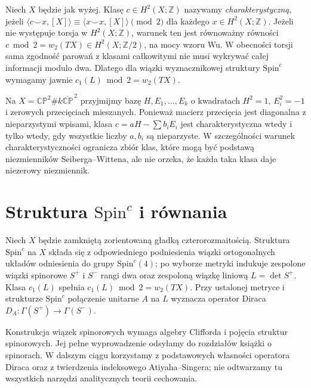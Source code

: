 \begin{definicja}
Niech $X$ będzie jak wyżej. Klasę $c\in H^2(X;\mathbb Z)$
nazywamy \emph{charakterystyczną}, jeżeli
$\langle c\smile x,[X]\rangle\equiv
\langle x\smile x,[X]\rangle\pmod2$
dla każdego $x\in H^2(X;\mathbb Z)$.
Jeżeli nie występuje torsja w $H^2(X;\mathbb Z)$,
warunek ten jest równoważny równości
$c\bmod2=w_2(TX)\in H^2(X;\mathbb Z/2)$,
na mocy wzoru Wu. W obecności torsji sama zgodność
parowań z klasami całkowitymi nie musi wykrywać całej
informacji modulo dwa. Dlatego dla wiązki wyznacznikowej
struktury $\mathrm{Spin}^c$ wymagamy jawnie
$c_1(L)\bmod2=w_2(TX)$.
\end{definicja}

\begin{przyklad}
Na $X=\mathbb{CP}^2\#k\overline{\mathbb{CP}}^{\,2}$
przyjmijmy bazę $H,E_1,\ldots,E_k$ o kwadratach
$H^2=1$, $E_i^2=-1$ i zerowych przecięciach mieszanych.
Ponieważ macierz przecięcia jest diagonalna z nieparzystymi
wpisami, klasa $c=aH-\sum b_iE_i$ jest charakterystyczna
wtedy i tylko wtedy, gdy wszystkie liczby $a,b_i$ są
nieparzyste. W szczególności warunek charakterystyczności
ogranicza zbiór klas, które mogą być podstawą
niezmienników Seiberga--Wittena, ale nie orzeka,
że każda taka klasa daje niezerowy niezmiennik.
\end{przyklad}

\section{Struktura \texorpdfstring{$\mathrm{Spin}^c$}{Spinc} i równania}
\label{sec:tg-sw-equations}

\begin{definicja}
Niech $X$ będzie zamkniętą zorientowaną gładką
czterorozmaitością. Struktura $\mathrm{Spin}^c$ na $X$
składa się z odpowiedniego podniesienia wiązki
ortogonalnych układów odniesienia do grupy
$\mathrm{Spin}^c(4)$; po wyborze metryki indukuje
zespolone wiązki spinorowe $S^+$ i $S^-$ rangi dwa
oraz zespoloną wiązkę liniową $L=\det S^+$.
Klasa $c_1(L)$ spełnia $c_1(L)\bmod2=w_2(TX)$.
Przy ustalonej metryce i strukturze $\mathrm{Spin}^c$
połączenie unitarne $A$ na $L$ wyznacza operator Diraca
$D_A:\Gamma(S^+)\to\Gamma(S^-)$.
\end{definicja}

\begin{uwaga}
Konstrukcja wiązek spinorowych wymaga algebry Clifforda
i pojęcia struktur spinorowych. Jej pełne wyprowadzenie
odsyłamy do rozdziałów książki o spinorach.
W dalszym ciągu korzystamy z podstawowych własności
operatora Diraca oraz z twierdzenia indeksowego
Atiyaha--Singera; nie odtwarzamy tu wszystkich narzędzi
analitycznych teorii cechowania.
\end{uwaga}

